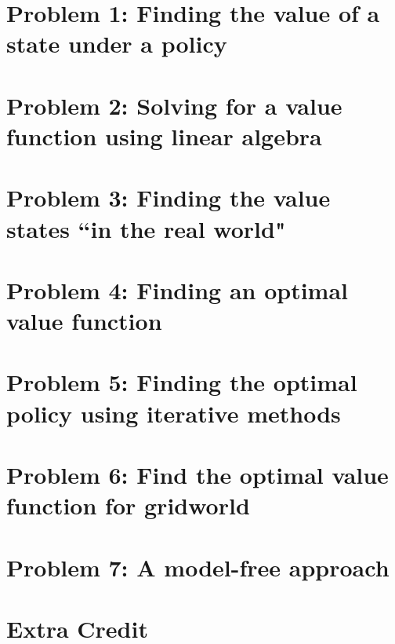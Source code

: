 \documentclass[twoside,11pt]{homework}
\date{\today} %
\DeclarePairedDelimiter{\2norm}{\lVert}{\rVert^2_2}
\newcommand{\1}[1]{\mathds{1}\left[#1\right]}
\begin{document}
\maketitle

\section*{Problem 1: Finding the value of a state under a policy}


\section*{Problem 2: Solving for a value function using linear algebra}


\section*{Problem 3: Finding the value states ``in the real world"}


\section*{Problem 4: Finding an optimal value function}


\section*{Problem 5: Finding the optimal policy using iterative methods}


\section*{Problem 6: Find the optimal value function for gridworld}


\section*{Problem 7: A model-free approach}


\section*{Extra Credit}
\end{document}
